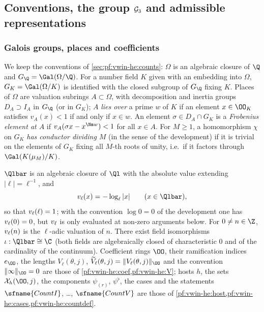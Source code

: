 \subsection{Conventions, the group \texorpdfstring{$\mathcal G_3$}{G3} and admissible representations}\label{sec:pf:eis:conv}

\subsubsection{Galois groups, places and coefficients}

We keep the conventions of \cref{sec:pf:vwin-he:counts}: $\Omega$ is an algebraic closure of $\Q$ and
$G_\Q=\Gal(\Omega/\Q)$. For a number field $K$ given with an embedding into $\Omega$, $G_K=\Gal(\Omega/K)$ is
identified with the closed subgroup of $G_\Q$ fixing $K$. Places of $\Omega$ are valuation subrings $A\subset\Omega$,
with decomposition and inertia groups $D_A\supset I_A$ in $G_\Q$ (or in $G_K$); $A$ \emph{lies over} a prime $w$ of
$K$ if an element $x\in\OO_K$ satisfies $v_A(x)<1$ if and only if $x\in w$. An element $\sigma\in D_A\cap G_K$ is a
\emph{Frobenius element at $A$} if $v_A(\sigma x-x^{\Nm w})<1$ for all $x\in A$. For $M\ge1$, a homomorphism $\chi$ on
$G_K$ \emph{has conductor dividing $M$} (in the sense of the development) if it is trivial on the elements of $G_K$
fixing all $M$-th roots of unity, i.e.\ if it factors through $\Gal(K(\mu_M)/K)$.

$\Qlbar$ is an algebraic closure of $\Ql$ with the absolute value extending $|\ell|=\ell^{-1}$, and
\begin{equation}\label{pf:eis:vl}
\eisv(x)=-\log_\ell|x|\qquad(x\in\Qlbar),
\end{equation}
so that $v_\ell(\ell)=1$; with the convention $\log0=0$ of the development one has $v_\ell(0)=0$, but $v_\ell$ is only
evaluated at non-zero arguments below. For $0\ne n\in\Z$, $v_\ell(n)$ is the $\ell$-adic valuation of $n$. There exist
field isomorphisms $\iota:\Qlbar\cong\C$ (both fields are algebraically closed of characteristic $0$ and of the
cardinality of the continuum). Coefficient rings $\OO$, their ramification indices $e_\OO$, the lengths
$V_\ell(\theta,j)$, $\eisVt_\ell(\theta,j)=\|V_\ell(\theta,j)\|_\OO$ and the convention $\|\infty\|_\OO=0$ are those of
\cref{pf:vwin-he:coef,pf:vwin-he:V}; hosts $h$, the sets $\eisX_h(\OO,j)$, the components $\psi_{(r)}$, $\psi^\flat$,
the cases and the statements $\sfname{CountI}$, \dots, $\sfname{CountV}$ are those of
\cref{pf:vwin-he:host,pf:vwin-he:cases,pf:vwin-he:countdef}.

